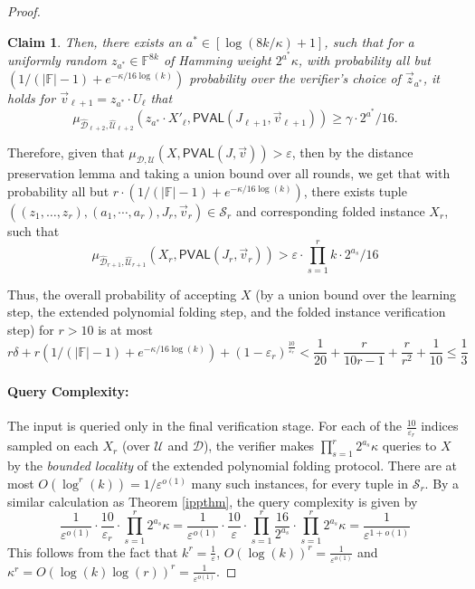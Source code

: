 \documentclass[11pt]{article}
\newtheorem{claim}[theorem]{Claim}
\newcommand{\PVAL}{\mathsf{PVAL}}
\newcommand{\F}{\mathbb{F}}
\newcommand{\sU}{\mathcal{U}}
\newcommand{\sD}{\mathcal{D}}
\begin{document}
\begin{proof}
\begin{claim}
Then, there exists an $a^* \in [\log (8k/\kappa)+1]$, such that for a uniformly random $z_{a^*} \in \F^{8k}$ of Hamming weight $2^{a^*}\kappa$, with probability all but $(1/(\vert \F\vert -1)+e^{-\kappa/16 \log (k)})$ probability over the verifier’s choice of $\vec{z}_{a^{\ast}}$, it holds for $\vec{v}_{\ell+1}=z_{a^{\ast}}\cdot U_\ell$ that
\begin{equation*}
    \mu_{\widehat{\sD}_{\ell+2},\widehat{\sU}_{\ell+2}} (z_{a^*} \cdot X'_\ell,\PVAL(J_{\ell+1},\vec{v}_{\ell+1})) \geq \gamma \cdot2^{a^{\ast}}/16.
\end{equation*}
\end{claim}

Therefore, given that $\mu_{\sD,\sU}(X,\PVAL(J,\vec{v}))>\varepsilon$, then by the distance preservation lemma and taking a union bound over all rounds, we get that with probability all but $r \cdot (1/(\vert \F\vert -1)+e^{-\kappa/16 \log (k)})$, there exists tuple $((z_1,\dots,z_{r}), (a_{1},\cdots, a_{r}), J_{r},\vec{v}_{r}) \in \mathcal{S}_r$ and corresponding folded instance $X_{r}$, such that 
\begin{equation*}
    \mu_{\widehat{\sD}_{r+1},\widehat{\sU}_{r+1}}(X_r, \PVAL(J_r,\vec{v}_r)) > \varepsilon\cdot \prod_{s=1}^{r}k \cdot 2^{a_{s}}/16
\end{equation*}

Thus, the overall probability of accepting $X$ (by a union bound over the learning step, the extended polynomial folding step, and the folded instance verification step) for $r>10$ is at most
\begin{equation*}
    r\delta + r(1/(\vert \F\vert -1) + e^{-\kappa/16 \log (k)}) + (1-\varepsilon_{r})^{\frac{10}{\varepsilon_{r}}} < \frac{1}{20}+\frac{r}{10r-1}+\frac{r}{r^{2}}+ \frac{1}{10}\leq \frac{1}{3}
\end{equation*}
\vspace{0.1in}

\paragraph*{Query Complexity:} The input is queried only in the final verification stage. For each of the $\frac{10}{\varepsilon_{r}}$ indices sampled on each $X_{r}$ (over $\sU$ and $\sD$), the verifier makes $\prod_{s=1}^{r}2^{a_{s}}\kappa$ queries to $X$ by the \textit{bounded locality} of the extended polynomial folding protocol. There are at most $O(\log^{r} (k))=1/\varepsilon^{o(1)}$ many such instances, for every tuple in $\mathcal{S}_r$. By a similar calculation as Theorem \ref{ippthm}, the query complexity is given by 
\begin{equation*}
    \frac{1}{\varepsilon^{o(1)}}\cdot \frac{10}{\varepsilon_{r}}\cdot\prod_{s=1}^{r}2^{a_{s}}\kappa =\frac{1}{\varepsilon^{o(1)}}\cdot \frac{10}{\varepsilon}\cdot\prod_{s=1}^{r}\frac{16}{2^{a_{s}}}\cdot\prod_{s=1}^{r}2^{a_{s}}\kappa =\frac{1}{\varepsilon^{1+o(1)}}
\end{equation*}
\noindent This follows from the fact that $k^{r}=\frac{1}{\varepsilon}$, $O(\log (k))^{r}=\frac{1}{\varepsilon^{o(1)}}$ and $\kappa^{r}=O(\log (k) \log (r))^{r}=\frac{1}{\varepsilon^{o(1)}}$. 


\end{proof}
\end{document}
